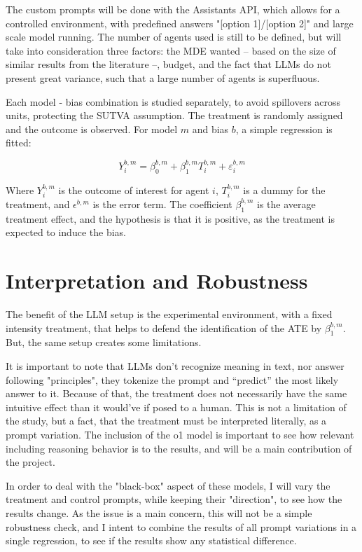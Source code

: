 \documentclass[12pt]{article}
\begin{document}
The custom prompts will be done with the Assistants API, which allows for a controlled environment, with predefined answers "[option 1]/[option 2]" and large scale model running. The number of agents used is still to be defined, but will take into consideration three factors: the MDE wanted -- based on the size of similar results from the literature --, budget, and the fact that LLMs do not present great variance, such that a large number of agents is superfluous.

Each model - bias combination is studied separately, to avoid spillovers across units, protecting the SUTVA assumption. The treatment is randomly assigned and the outcome is observed. For model $m$ and bias $b$, a simple regression is fitted:

$$Y^{b,m}_i = \beta^{b,m}_0 + \beta^{b,m}_1 T^{b,m}_i + \varepsilon^{b,m}_i$$

Where $Y^{b,m}_i$ is the outcome of interest for agent $i$, $T^{b,m}_i$ is a dummy for the treatment, and $\epsilon^{b,m}$ is the error term. The coefficient $\beta^{b,m}_1$ is the average treatment effect, and the hypothesis is that it is positive, as the treatment is expected to induce the bias.


\section*{Interpretation and Robustness}

The benefit of the LLM setup is the experimental environment, with a fixed intensity treatment, that helps to defend the identification of the ATE by $\beta^{b,m}_1$. But, the same setup creates some limitations.

It is important to note that LLMs don't recognize meaning in text, nor answer following "principles", they tokenize the prompt and “predict” the most likely answer to it. Because of that, the treatment does not necessarily have the same intuitive effect than it would've if posed to a human. This is not a limitation of the study, but a fact, that the treatment must be interpreted literally, as a prompt variation. The inclusion of the o1 model is important to see how relevant including reasoning behavior is to the results, and will be a main contribution of the project.

In order to deal with the "black-box" aspect of these models, I will vary the treatment and control prompts, while keeping their "direction", to see how the results change. As the issue is a main concern, this will not be a simple robustness check, and I intent to combine the results of all prompt variations in a single regression, to see if the results show any statistical difference.
\end{document}
